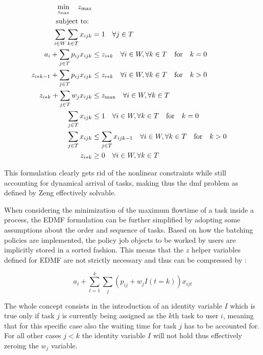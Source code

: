 \documentclass{seal_thesis}
\begin{document}
\begin{align}
    \min_{z_{\text{max}}} \quad z_{\text{max}}\\
    \text{subject to: } \notag \\
    \sum_{i \in W} \sum_{k \in T} x_{ijk} &= 1 \quad \forall j \in T\\
    a_i + \sum_{j \in T} p_{ij} x_{ijk} &\leq z_{i*k} \quad \forall i \in W, \forall k \in T \quad \text{for} \quad k=0\\
    z_{i*k-1} + \sum_{j \in T} p_{ij} x_{ijk} &\leq z_{i*k} \quad \forall i \in W, \forall k \in T \quad \text{for} \quad k>0\\
    z_{i*k}+ \sum_{j \in T} w_j x_{ijk} &\leq z_{\text{max}} \quad \forall i \in W, \forall k \in T\\
    \sum_{j \in T} x_{ijk} &\leq 1 \quad \forall i \in W, \forall k \in T \quad \text{for} \quad k=0\\
    \sum_{j \in T} x_{ijk} &\leq \sum_{j \in T} x_{ijk-1} \quad \forall i \in W, \forall k \in T \quad \text{for} \quad k>0\\
    z_{i*k} &\geq 0 \quad \forall i \in W, \forall k \in T
\end{align}

This formulation clearly gets rid of the nonlinear constraints while still accounting for dynamical arrival of tasks, making thus the \gls{dmf} problem as defined by Zeng effectively solvable.

When considering the minimization of the maximum flowtime of a task inside a process, the EDMF formulation can be further simplified by adopting some assumptions about the order and sequence of tasks. Based on how the batching policies are implemented, the policy job objects to be worked by users are implicitly stored in a sorted fashion. This means that the $z$ helper variables defined for EDMF are not strictly necessary and thus can be compressed by :

\begin{equation}
\label{eq:simplified_z_with_k}
	a_i + \sum_{t=1}^k \sum_j (p_{ij} + w_j I(t=k))x_{ijt}
\end{equation}

The whole concept consists in the introduction of an identity variable $I$ which is true only if task $j$ is currently being assigned as the $k$th task to user $i$, meaning that for this specific case also the waiting time for task $j$ has to be accounted for. For all other cases \ie $j<k$ the identity variable $I$ will not hold thus effectively zeroing the $w_j$ variable.
\end{document}
